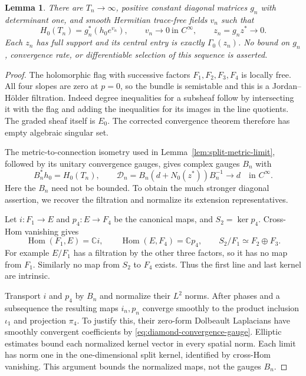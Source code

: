 \documentclass[11pt]{amsart}
\newtheorem{lemma}[theorem]{Lemma}
\theoremstyle{definition}
\theoremstyle{remark}
\newcommand{\CC}{\mathbb C}
\newcommand{\Hom}{\operatorname{Hom}}
\begin{document}
\begin{lemma}\label{lem:diamond-matching}
There are $T_n\to\infty$, positive constant diagonal matrices
$g_n$ with determinant one, and smooth Hermitian trace-free
fields $v_n$ such that
\begin{equation}\label{eq:diamond-matching}
 H_0(T_n)=g_n^*(h_0e^{v_n}),\qquad
 v_n\longrightarrow0\ \text{in }C^\infty,\qquad
 z_n=g_nz^*\longrightarrow0 .
\end{equation}
Each $z_n$ has full support and its central entry is exactly
$\Gamma_0(z_n)$. No bound on $g_n$, convergence rate, or
differentiable selection of this sequence is asserted.
\end{lemma}
\begin{proof}
The holomorphic flag with successive factors $F_1,F_2,F_3,F_4$
is locally free. All four slopes are zero at $p=0$, so the
bundle is semistable and this is a Jordan--H\"older filtration.
Indeed degree inequalities for a subsheaf follow by intersecting
it with the flag and adding the inequalities for its images in
the line quotients. The graded sheaf itself is $E_0$.
The corrected convergence theorem
\cite[Theorem 1.1(2) and Section 2.2]{SibleyWentworth15}
therefore has empty algebraic singular set.

The metric-to-connection isometry used in
Lemma~\ref{lem:split-metric-limit}, followed by its unitary
convergence gauges, gives complex gauges $B_n$ with
\begin{equation}\label{eq:diamond-convergence-gauge}
 B_n^*h_0=H_0(T_n),\qquad
 \mathcal D_n=B_n(d+N_0(z^*))B_n^{-1}\longrightarrow d
                 \quad\text{in }C^\infty .
\end{equation}
Here the $B_n$ need not be bounded. To obtain the much stronger
diagonal assertion, we recover the filtration and normalize its
extension representatives.

Let $i:F_1\to E$ and $p_4:E\to F_4$ be the canonical maps, and
$S_2=\ker p_4$. Cross-Hom vanishing gives
\[
 \Hom(F_1,E)=\CC i,\qquad \Hom(E,F_4)=\CC p_4,\qquad
 S_2/F_1\simeq F_2\oplus F_3 .
\]
For example $E/F_1$ has a filtration by the other three factors,
so it has no map from $F_1$. Similarly no map from $S_2$ to
$F_4$ exists. Thus the first line and last kernel are intrinsic.

Transport $i$ and $p_4$ by $B_n$ and normalize their $L^2$ norms.
After phases and a subsequence the resulting maps $i_n,p_n$
converge smoothly to the product inclusion $\iota_1$ and
projection $\pi_4$. To justify this, their zero-form Dolbeault
Laplacians have smoothly convergent coefficients by
\eqref{eq:diamond-convergence-gauge}. Elliptic estimates bound
each normalized kernel vector in every spatial norm. Each limit
has norm one in the one-dimensional split kernel, identified by
cross-Hom vanishing. This argument bounds the normalized maps,
not the gauges $B_n$.


\end{proof}
\end{document}
